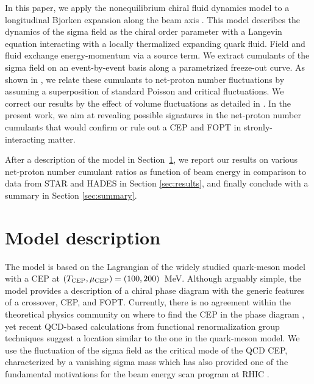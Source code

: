 \documentclass[%
 reprint,
 amsmath,amssymb,
 aps,
]{revtex4-2}
\begin{document}
In this paper, we apply the nonequilibrium chiral fluid dynamics model \cite{Nahrgang:2011mg} to a longitudinal Bjorken expansion along the beam axis \cite{Herold:2018ptm}. This model describes the dynamics of the sigma field as the chiral order parameter with a Langevin equation interacting with a locally thermalized expanding quark fluid. Field and fluid exchange energy-momentum via a source term. We extract cumulants of the sigma field on an event-by-event basis along a parametrized freeze-out curve. As shown in \cite{Stephanov:2011pb}, we relate these cumulants to net-proton number fluctuations by assuming a superposition of standard Poisson and critical fluctuations. We correct our results by the effect of volume fluctuations as detailed in \cite{Skokov:2012ds}. In the present work, we aim at revealing possible signatures in the net-proton number cumulants that would confirm or rule out a CEP and FOPT in stronly-interacting matter. 

After a description of the model in Section~\ref{sec:model}, we report our results on various net-proton number cumulant ratios as function of beam energy in comparison to data from STAR and HADES in Section \ref{sec:results}, and finally conclude with a summary in Section \ref{sec:summary}.


\section{Model description}
\label{sec:model}

The model is based on the Lagrangian of the widely studied quark-meson model \cite{Scavenius:2000qd,Mocsy:2004ab,Schaefer:2004en} with a CEP at $(T_{\rm CEP}, \mu_{\rm CEP})=(100,200)$~MeV. Although arguably simple, the model provides a description of a chiral phase diagram with the generic features of a crossover, CEP, and FOPT. Currently, there is no agreement within the theoretical physics community on where to find the CEP in the phase diagram \cite{Pandav:2022xxx}, yet recent QCD-based calculations from functional renormalization group techniques \cite{Fu:2019hdw,Gao:2020fbl} suggest a location similar to the one in the quark-meson model. We use the fluctuation of the sigma field as the critical mode of the QCD CEP, characterized by a vanishing sigma mass which has also provided one of the fundamental motivations for the beam energy scan program at RHIC \cite{Stephanov:2011pb,Luo:2015ewa}.
\end{document}
